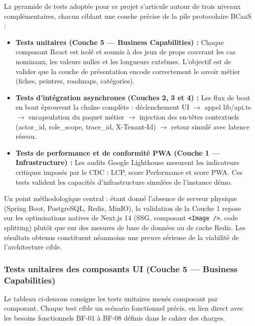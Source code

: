 \documentclass[12pt,a4paper]{report}
\begin{document}
La pyramide de tests adoptée pour ce projet s'articule autour de trois niveaux complémentaires, chacun ciblant une couche précise de la pile protocolaire BCaaS :

\begin{itemize}
    \item \textbf{Tests unitaires (Couche 5 --- Business Capabilities) :} Chaque composant React est isolé et soumis à des jeux de props couvrant les cas nominaux, les valeurs nulles et les longueurs extrêmes. L'objectif est de valider que la couche de présentation encode correctement le savoir métier (fiches, peintres, roadmaps, catégories).
    \item \textbf{Tests d'intégration asynchrones (Couches 2, 3 et 4) :} Les flux de bout en bout éprouvent la chaîne complète : déclenchement UI $\rightarrow$ appel lib/api.ts $\rightarrow$ encapsulation du paquet métier $\rightarrow$ injection des en-têtes contextuels (actor\_id, role\_scope, trace\_id, X-Tenant-Id) $\rightarrow$ retour simulé avec latence réseau.
    \item \textbf{Tests de performance et de conformité PWA (Couche 1 --- Infrastructure) :} Les audits Google Lighthouse mesurent les indicateurs critiques imposés par le CDC : LCP, score Performance et score PWA. Ces tests valident les capacités d'infrastructure simulées de l'instance démo.
\end{itemize}

Un point méthodologique central : étant donné l'absence de serveur physique (Spring Boot, PostgreSQL, Redis, MinIO), la validation de la Couche 1 repose sur les optimisations natives de Next.js 14 (SSG, composant \texttt{<Image />}, code splitting) plutôt que sur des mesures de base de données ou de cache Redis. Les résultats obtenus constituent néanmoins une preuve sérieuse de la viabilité de l'architecture cible.

\subsubsection*{Tests unitaires des composants UI (Couche 5 --- Business Capabilities)}

Le tableau ci-dessous consigne les tests unitaires menés composant par composant. Chaque test cible un scénario fonctionnel précis, en lien direct avec les besoins fonctionnels BF-01 à BF-08 définis dans le cahier des charges.
\end{document}
